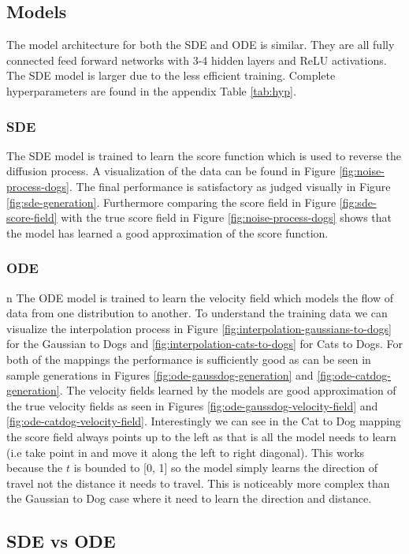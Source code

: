\documentclass[conference,a4paper]{IEEEtran}
\begin{document}
\subsection{Models}
The model architecture for both the SDE and ODE is similar. They are all fully connected feed forward networks with 3-4 hidden layers and ReLU activations. The SDE model is larger due to the less efficient training. Complete hyperparameters are found in the appendix Table \ref{tab:hyp}.

\subsubsection{SDE}
The SDE model is trained to learn the score function which is used to reverse the diffusion process. A visualization of the data can be found in Figure \ref{fig:noise-process-dogs}. The final performance is satisfactory as judged visually in Figure \ref{fig:sde-generation}. Furthermore comparing the score field in Figure \ref{fig:sde-score-field} with the true score field in Figure \ref{fig:noise-process-dogs} shows that the model has learned a good approximation of the score function.

\subsubsection{ODE}
n
The ODE model is trained to learn the velocity field which models the flow of data from one distribution to another. To understand the training data we can visualize the interpolation process in Figure \ref{fig:interpolation-gaussians-to-dogs} for the Gaussian to Dogs  and \ref{fig:interpolation-cats-to-dogs} for Cats to Dogs. For both of the mappings the performance is sufficiently good as can be seen in sample generations in Figures \ref{fig:ode-gaussdog-generation} and \ref{fig:ode-catdog-generation}. The velocity fields learned by the models are good approximation of the true velocity fields as seen in Figures \ref{fig:ode-gaussdog-velocity-field} and \ref{fig:ode-catdog-velocity-field}. Interestingly we can see in the Cat to Dog mapping the score field always points up to the left as that is all the model needs to learn (i.e take point in and move it along the left to right diagonal). This works because the $t$ is bounded to [0, 1] so the model simply learns the direction of travel not the distance it needs to travel. This is noticeably more complex than the Gaussian to Dog case where it need to learn the direction and distance.

\subsection{SDE vs ODE}
\end{document}
